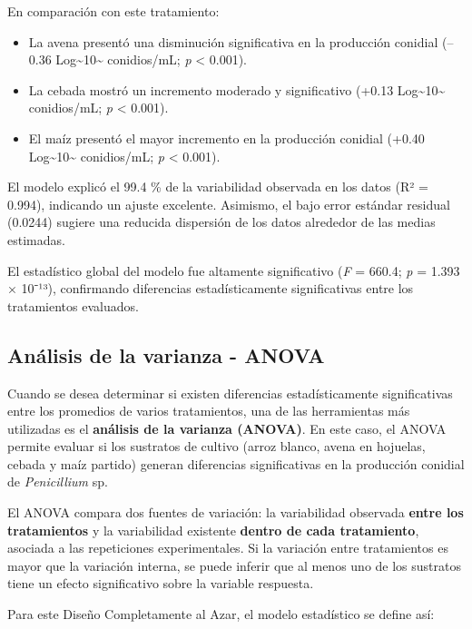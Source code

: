 \documentclass[
  spanish,
  letterpaper,
  DIV=11,
  numbers=noendperiod]{scrreprt}
\begin{document}
En comparación con este tratamiento:

\begin{itemize}
\item
  La avena presentó una disminución significativa en la producción
  conidial (--0.36 Log\textasciitilde10\textasciitilde{} conidios/mL;
  \emph{p} \textless{} 0.001).
\item
  La cebada mostró un incremento moderado y significativo (+0.13
  Log\textasciitilde10\textasciitilde{} conidios/mL; \emph{p}
  \textless{} 0.001).
\item
  El maíz presentó el mayor incremento en la producción conidial (+0.40
  Log\textasciitilde10\textasciitilde{} conidios/mL; \emph{p}
  \textless{} 0.001).
\end{itemize}

El modelo explicó el 99.4 \% de la variabilidad observada en los datos
(R² = 0.994), indicando un ajuste excelente. Asimismo, el bajo error
estándar residual (0.0244) sugiere una reducida dispersión de los datos
alrededor de las medias estimadas.

El estadístico global del modelo fue altamente significativo (\emph{F} =
660.4; \emph{p} = 1.393 × 10⁻¹³), confirmando diferencias
estadísticamente significativas entre los tratamientos evaluados.

\subsection{Análisis de la varianza -
ANOVA}\label{anuxe1lisis-de-la-varianza---anova}

Cuando se desea determinar si existen diferencias estadísticamente
significativas entre los promedios de varios tratamientos, una de las
herramientas más utilizadas es el \textbf{análisis de la varianza
(ANOVA)}. En este caso, el ANOVA permite evaluar si los sustratos de
cultivo (arroz blanco, avena en hojuelas, cebada y maíz partido) generan
diferencias significativas en la producción conidial de
\emph{Penicillium} sp.

El ANOVA compara dos fuentes de variación: la variabilidad observada
\textbf{entre los tratamientos} y la variabilidad existente
\textbf{dentro de cada tratamiento}, asociada a las repeticiones
experimentales. Si la variación entre tratamientos es mayor que la
variación interna, se puede inferir que al menos uno de los sustratos
tiene un efecto significativo sobre la variable respuesta.

Para este Diseño Completamente al Azar, el modelo estadístico se define
así:
\end{document}
